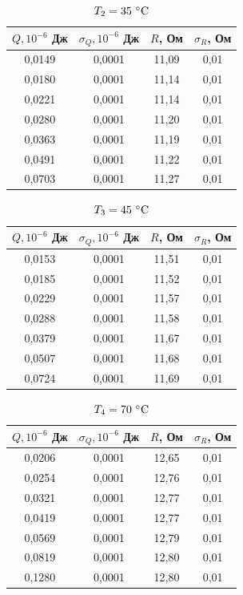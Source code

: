 \documentclass[a4paper, 12pt]{article}
\begin{document}
\begin{table}[h!]
\begin{center}
\begin{tabular}{|c|c|c|c|}
\hline
$Q, 10^{-6}$ Дж & $\sigma_Q, 10^{-6}$ Дж & $R$, Ом & $\sigma_R$, Ом \\ \hline
0,0149 & 0,0001 & 11,09 & 0,01 \\ \hline
0,0180 & 0,0001 & 11,14 & 0,01 \\ \hline
0,0221 & 0,0001 & 11,14 & 0,01 \\ \hline
0,0280 & 0,0001 & 11,20 & 0,01 \\ \hline
0,0363 & 0,0001 & 11,19 & 0,01 \\ \hline
0,0491 & 0,0001 & 11,22 & 0,01 \\ \hline
0,0703 & 0,0001 & 11,27 & 0,01 \\ \hline
\end{tabular}
\caption{$T_2 = 35~\celsius$}
\label{tab2}
\end{center}
\end{table}

\begin{table}[h!]
\begin{center}
\begin{tabular}{|c|c|c|c|}
\hline
$Q, 10^{-6}$ Дж & $\sigma_Q, 10^{-6}$ Дж & $R$, Ом & $\sigma_R$, Ом \\ \hline
0,0153 & 0,0001 & 11,51 & 0,01 \\ \hline
0,0185 & 0,0001 & 11,52 & 0,01 \\ \hline
0,0229 & 0,0001 & 11,57 & 0,01 \\ \hline
0,0288 & 0,0001 & 11,58 & 0,01 \\ \hline
0,0379 & 0,0001 & 11,67 & 0,01 \\ \hline
0,0507 & 0,0001 & 11,68 & 0,01 \\ \hline
0,0724 & 0,0001 & 11,69 & 0,01 \\ \hline
\end{tabular}
\caption{$T_3 = 45~\celsius$}
\label{tab3}
\end{center}
\end{table}

\newpage

\begin{table}[h!]
\begin{center}
\begin{tabular}{|c|c|c|c|}
\hline
$Q, 10^{-6}$ Дж & $\sigma_Q, 10^{-6}$ Дж & $R$, Ом & $\sigma_R$, Ом \\ \hline
0,0206 & 0,0001 & 12,65 & 0,01 \\ \hline
0,0254 & 0,0001 & 12,76 & 0,01 \\ \hline
0,0321 & 0,0001 & 12,77 & 0,01 \\ \hline
0,0419 & 0,0001 & 12,77 & 0,01 \\ \hline
0,0569 & 0,0001 & 12,79 & 0,01 \\ \hline
0,0819 & 0,0001 & 12,80 & 0,01 \\ \hline
0,1280 & 0,0001 & 12,80 & 0,01 \\ \hline
\end{tabular}
\caption{$T_4 = 70~\celsius$}
\label{tab4}
\end{center}
\end{table}
\end{document}
